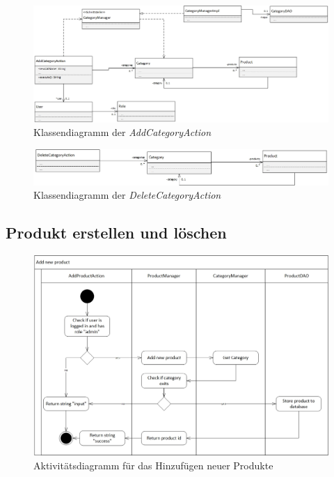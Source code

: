 \documentclass[12pt,a4paper]{article}
\begin{document}
	\begin{figure}[H]
		\centering
		\includegraphics[scale=0.5]{diagrams/AddCategoryAction_class.jpg}
		\caption{Klassendiagramm der \textit{AddCategoryAction}}
	\end{figure}

	\begin{figure}[H]
		\centering
		\includegraphics[scale=0.5]{diagrams/DeleteCategoryAction_class.jpg}
		\caption{Klassendiagramm der \textit{DeleteCategoryAction}}
	\end{figure}

	\subsection{Produkt erstellen und löschen}
	\begin{figure}[H]
		\centering
		\includegraphics[scale=0.5]{diagrams/AddProductAction_activity.jpg}
		\caption{Aktivitätsdiagramm für das Hinzufügen neuer Produkte}
	\end{figure}
\end{document}
